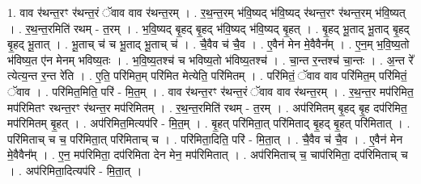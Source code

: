 \documentclass[17pt]{extarticle}
\begin{document}
1. वाव र॑थन्त॒रꣳ र॑थन्त॒रं ॅवाव वाव र॑थन्त॒रम् । . र॒थ॒न्त॒रम् भ॑वि॒ष्यद् भ॑वि॒ष्यद् र॑थन्त॒रꣳ र॑थन्त॒रम् भ॑वि॒ष्यत् । . र॒थ॒न्त॒रमिति॑ रथम् - त॒रम् । . भ॒वि॒ष्यद् बृ॒हद् बृ॒हद् भ॑वि॒ष्यद् भ॑वि॒ष्यद् बृ॒हत् । . बृ॒हद् भू॒ताद् भू॒ताद् बृ॒हद् बृ॒हद् भू॒तात् । . भू॒ताच् च॑ च भू॒ताद् भू॒ताच् च॑ । . चै॒वैव च॑ चै॒व । . ए॒वैन॑ मेन मे॒वैवैन᳚म् । . ए॒न॒म् भ॒वि॒ष्य॒तो भ॑विष्य॒त ए॑न मेनम् भविष्य॒तः । . भ॒वि॒ष्य॒तश्च॑ च भविष्य॒तो भ॑विष्य॒तश्च॑ । . चा॒न्त र॒न्तश्च॑ चा॒न्तः । . अ॒न्त रे᳚ त्येत्य॒न्त र॒न्त रे॑ति । . ए॒ति॒ परि॑मित॒म् परि॑मित मेत्येति॒ परि॑मितम् । . परि॑मितं॒ ॅवाव वाव परि॑मित॒म् परि॑मितं॒ ॅवाव । . परि॑मित॒मिति॒ परि॑ - मि॒त॒म् । . वाव र॑थन्त॒रꣳ र॑थन्त॒रं ॅवाव वाव र॑थन्त॒रम् । . र॒थ॒न्त॒र मप॑रिमित॒ मप॑रिमितꣳ रथन्त॒रꣳ र॑थन्त॒र मप॑रिमितम् । . र॒थ॒न्त॒रमिति॑ रथम् - त॒रम् । . अप॑रिमितम् बृ॒हद् बृ॒ह दप॑रिमित॒ मप॑रिमितम् बृ॒हत् । . अप॑रिमित॒मित्यप॑रि - मि॒त॒म् । . बृ॒हत् परि॑मिता॒त् परि॑मिताद् बृ॒हद् बृ॒हत् परि॑मितात् । . परि॑मिताच् च च॒ परि॑मिता॒त् परि॑मिताच् च । . परि॑मिता॒दिति॒ परि॑ - मि॒ता॒त् । . चै॒वैव च॑ चै॒व । . ए॒वैन॑ मेन मे॒वैवैन᳚म् । . ए॒न॒ मप॑रिमिता॒ दप॑रिमिता देन मेन॒ मप॑रिमितात् । . अप॑रिमिताच् च॒ चाप॑रिमिता॒ दप॑रिमिताच् च । . अप॑रिमिता॒दित्यप॑रि - मि॒ता॒त् । \newline
\end{document}
